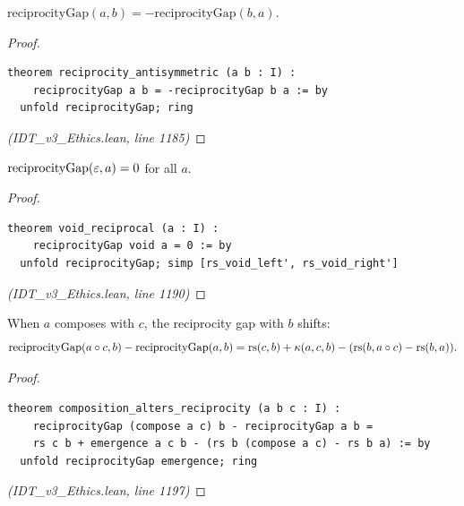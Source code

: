 \begin{theorem}
\label{thm:reciprocity-antisymm}
$\mathrm{reciprocityGap}(a, b) = -\mathrm{reciprocityGap}(b, a)$.
\end{theorem}

\begin{proof}
\begin{lstlisting}
theorem reciprocity_antisymmetric (a b : I) :
    reciprocityGap a b = -reciprocityGap b a := by
  unfold reciprocityGap; ring
\end{lstlisting}
\textit{(IDT\_v3\_Ethics.lean, line 1185)}
\end{proof}

\begin{theorem}
\label{thm:void-reciprocal}
$\mathrm{reciprocityGap}(\varepsilon, a) = 0$ for all $a$.
\end{theorem}

\begin{proof}
\begin{lstlisting}
theorem void_reciprocal (a : I) :
    reciprocityGap void a = 0 := by
  unfold reciprocityGap; simp [rs_void_left', rs_void_right']
\end{lstlisting}
\textit{(IDT\_v3\_Ethics.lean, line 1190)}
\end{proof}

\begin{theorem}
\label{thm:composition-reciprocity}
When $a$ composes with $c$, the reciprocity gap with $b$ shifts:
\[
  \mathrm{reciprocityGap}(a \circ c, b) - \mathrm{reciprocityGap}(a, b) =
  \mathrm{rs}(c, b) + \kappa(a, c, b) - (\mathrm{rs}(b, a \circ c) - \mathrm{rs}(b, a)).
\]
\end{theorem}

\begin{proof}
\begin{lstlisting}
theorem composition_alters_reciprocity (a b c : I) :
    reciprocityGap (compose a c) b - reciprocityGap a b =
    rs c b + emergence a c b - (rs b (compose a c) - rs b a) := by
  unfold reciprocityGap emergence; ring
\end{lstlisting}
\textit{(IDT\_v3\_Ethics.lean, line 1197)}
\end{proof}

